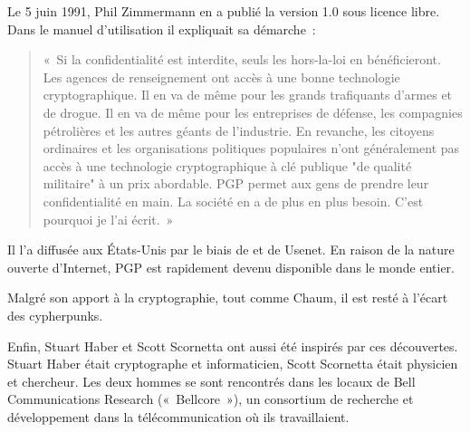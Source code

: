 Le 5 juin 1991, Phil Zimmermann en a publié la version 1.0 sous licence libre. Dans le manuel d'utilisation il expliquait sa démarche~:

\begin{quote}
«~Si la confidentialité est interdite, seuls les hors-la-loi en bénéficieront. Les agences de renseignement ont accès à une bonne technologie cryptographique. Il en va de même pour les grands trafiquants d'armes et de drogue. Il en va de même pour les entreprises de défense, les compagnies pétrolières et les autres géants de l'industrie. En revanche, les citoyens ordinaires et les organisations politiques populaires n'ont généralement pas accès à une technologie cryptographique à clé publique "de qualité militaire" à un prix abordable. PGP permet aux gens de prendre leur confidentialité en main. La société en a de plus en plus besoin. C'est pourquoi je l'ai écrit.~»
\end{quote} %


Il l'a diffusée aux États-Unis par le biais de  et de Usenet. En raison de la nature ouverte d'Internet, PGP est rapidement devenu disponible dans le monde entier.

Malgré son apport à la cryptographie, tout comme Chaum, il est resté à l'écart des cypherpunks.

Enfin, Stuart Haber et Scott Scornetta ont aussi été inspirés par ces découvertes. Stuart Haber était cryptographe et informaticien, Scott Scornetta était physicien et chercheur. Les deux hommes se sont rencontrés dans les locaux de Bell Communications Research («~Bellcore~»), un consortium de recherche et développement dans la télécommunication où ils travaillaient.

